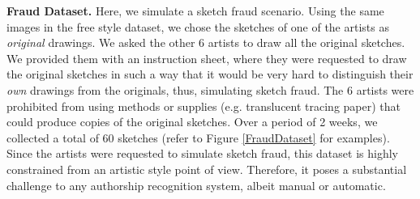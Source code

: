 \noindent\textbf{Fraud Dataset.}  Here, we simulate a sketch fraud scenario. Using the same images in the free style dataset, we chose the sketches of one of the artists as \emph{original} drawings. We asked the other 6 artists to draw all the original sketches. We provided them with an instruction sheet, where they were requested to draw the original sketches in such a way that it would be very hard to distinguish their \emph{own} drawings from the originals, thus, simulating sketch fraud. The 6 artists were prohibited from using methods or supplies (e.g. translucent tracing paper) that could produce copies of the original sketches. Over a period of 2 weeks, we collected a total of 60 sketches (refer to Figure \ref{FraudDataset} for examples). Since the artists were requested to simulate sketch fraud, this dataset is highly constrained from an artistic style point of view. Therefore, it poses a substantial challenge to any authorship recognition system, albeit manual or automatic.





